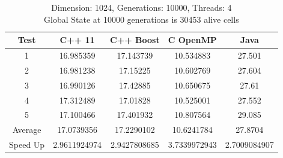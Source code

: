 \documentclass[11pt]{article} %
\begin{document}
\begin{table}[ht]
\caption{Dimension: 1024, Generations: 10000, Threads: 4\\Global State at 10000 generations is 30453 alive cells} %

\centering %

\begin{tabular}{c c c c c} %

\hline\hline %

Test & C++ 11 & C++ Boost & C OpenMP & Java \\ [0.5ex] %


\hline %

1 & 16.985359 & 17.143739 & 10.534883 & 27.501 \\
2 & 16.981238 & 17.15225 & 10.602769 & 27.604 \\
3 & 16.990126 & 17.42885 & 10.650675 & 27.61 \\
4 & 17.312489 & 17.01828 & 10.525001 & 27.552 \\
5 & 17.100466 & 17.401932 & 10.807564 & 29.085 \\
Average & 17.0739356 & 17.2290102 & 10.6241784 & 27.8704 \\
Speed Up & 2.9611924974 & 2.9427808685 & 3.7339972943 & 2.7009084907 \\ [1ex]





\hline %
\end{tabular}
\end{table}
\pagebreak[4]
\end{document}
